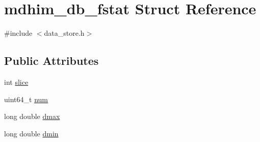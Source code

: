 \hypertarget{structmdhim__db__fstat}{\section{mdhim\-\_\-db\-\_\-fstat Struct Reference}
\label{structmdhim__db__fstat}
}


{\ttfamily \#include $<$data\-\_\-store.\-h$>$}

\subsection*{Public Attributes}
\begin{DoxyCompactItemize}
\item 
int \hyperlink{structmdhim__db__fstat_a058b21688809dbc426bf464f967c5bf3}{slice}
\item 
uint64\-\_\-t \hyperlink{structmdhim__db__fstat_a4ce8dc02a9a126e5079a50ba3509a49b}{num}
\item 
long double \hyperlink{structmdhim__db__fstat_a6a955791d2278a8f27816149f294b930}{dmax}
\item 
long double \hyperlink{structmdhim__db__fstat_a945705f2eeeb829955e11d21a9377b0f}{dmin}
\end{DoxyCompactItemize}


